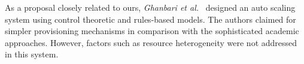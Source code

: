 As a proposal closely related to ours, \emph{Ghanbari et al.}~\cite{ghanbari_exploring_2011} designed an auto scaling system using control theoretic and rules-based models. The authors claimed for simpler provisioning mechanisms in comparison with the sophisticated academic approaches. However, factors such as resource heterogeneity were not addressed in this system.  












